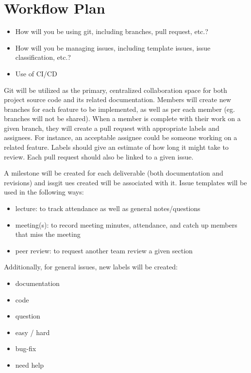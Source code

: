 \documentclass{article}
\begin{document}
\section{Workflow Plan}

\begin{itemize}
	\item How will you be using git, including branches, pull request, etc.?
	\item How will you be managing issues, including template issues, issue
	classification, etc.?
  \item Use of CI/CD
\end{itemize}

Git will be utilized as the primary, centralized collaboration space for both project
source code and its related documentation. Members will create new branches for each
feature to be implemented, as well as per each member (eg. branches will not be shared).
When a member is complete with their work on a given branch, they will create a pull request
with appropriate labels and assignees. For instance, an acceptable assignee could be someone
working on a related feature. Labels should give an estimate of how long it might take to
review. Each pull request should also be linked to a given issue.

A milestone will be created for each deliverable (both documentation and revisions) and issgit ues
created will be associated with it. Issue templates will be used in the following ways:

\begin{itemize}
  \item lecture: to track attendance as well as general notes/questions
  \item meeting(s): to record meeting minutes, attendance, and catch up members that miss the meeting
  \item peer review: to request another team review a given section
\end{itemize}

Additionally, for general issues, new labels will be created:

\begin{itemize}
  \item documentation
  \item code
  \item question
  \item easy / hard
  \item bug-fix
  \item need help
\end{itemize}
\end{document}
